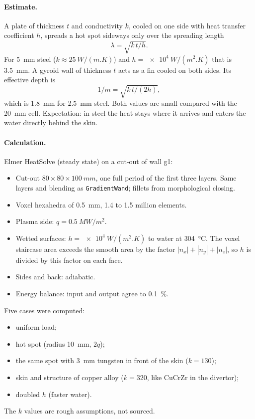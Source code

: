 \documentclass[10pt,a4paper]{article}
\begin{document}
\paragraph{Estimate.} A plate of thickness $t$ and conductivity $k$, cooled on one side with heat transfer coefficient
$h$, spreads a hot spot sideways only over the spreading length
\begin{equation}\lambda=\sqrt{k\,t/h}.\end{equation}
For \SI{5}{mm} steel ($k\approx\SI{25}{W/(m.K)}$) and $h=\SI{e4}{W/(m^2.K)}$ that is \SI{3.5}{mm}.
A gyroid wall of thickness $t$ acts as a fin cooled on both sides. Its effective depth is
\begin{equation}1/m=\sqrt{k\,t/(2h)},\end{equation}
which is \SI{1.8}{mm} for \SI{2.5}{mm} steel. Both values are small compared with the \SI{20}{mm} cell.
Expectation: in steel the heat stays where it arrives and enters the water directly behind the skin.

\paragraph{Calculation.} Elmer HeatSolve (steady state) on a cut-out of wall g1:
\begin{itemize}
\item Cut-out $80\times80\times\SI{100}{mm}$, one full period of the first three layers. Same layers and blending as \texttt{GradientWand}; fillets from morphological closing.
\item Voxel hexahedra of \SI{0.5}{mm}, 1.4 to 1.5 million elements.
\item Plasma side: $q=\SI{0.5}{MW/m^2}$.
\item Wetted surfaces: $h=\SI{e4}{W/(m^2.K)}$ to water at \SI{304}{\celsius}. The voxel staircase area exceeds the smooth area by the factor $|n_x|+|n_y|+|n_z|$, so $h$ is divided by this factor on each face.
\item Sides and back: adiabatic.
\item Energy balance: input and output agree to \SI{0.1}{\%}.
\end{itemize}
Five cases were computed:
\begin{itemize}
\item uniform load;
\item hot spot (radius \SI{10}{mm}, $2q$);
\item the same spot with \SI{3}{mm} tungsten in front of the skin ($k=130$);
\item skin and structure of copper alloy ($k=320$, like CuCrZr in the divertor);
\item doubled $h$ (faster water).
\end{itemize}
The $k$ values are rough assumptions, not sourced.
\end{document}
